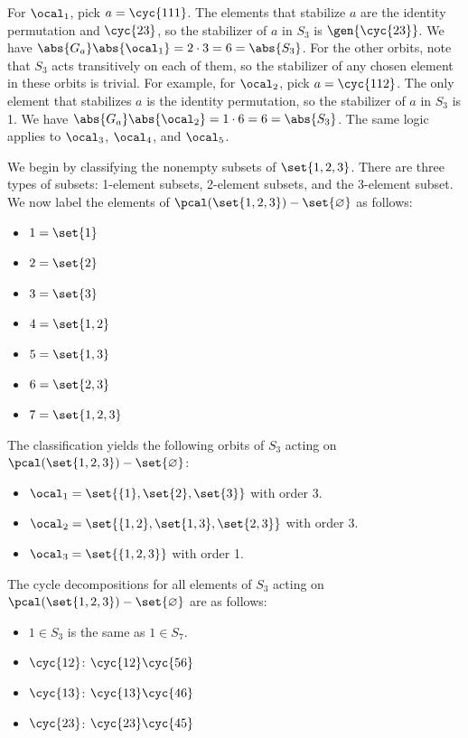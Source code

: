 \begin{solenum}
\begin{itemize}
	\end{itemize}
	For $\ocal_1$, pick $a = \cyc{1 1 1}$.
	The elements that stabilize $a$ are the identity permutation and $\cyc{2 3}$, so the stabilizer of $a$ in $S_3$ is $\gen{\cyc{2 3}}$.
	We have $\abs{G_a}\abs{\ocal_1} = 2 \cdot 3 = 6 = \abs{S_3}$.
	For the other orbits, note that $S_3$ acts transitively on each of them, so the stabilizer of any chosen element in these orbits is trivial.
	For example, for $\ocal_2$, pick $a = \cyc{1 1 2}$.
	The only element that stabilizes $a$ is the identity permutation, so the stabilizer of $a$ in $S_3$ is 1.
	We have $\abs{G_a}\abs{\ocal_2} = 1 \cdot 6 = 6 = \abs{S_3}$.
	The same logic applies to $\ocal_3$, $\ocal_4$, and $\ocal_5$.
	\item We begin by classifying the nonempty subsets of $\set{1, 2, 3}$.
	There are three types of subsets: 1-element subsets, 2-element subsets, and the 3-element subset.
	We now label the elements of $\pcal(\set{1, 2, 3}) - \set{\varnothing}$ as follows:
    \begin{itemize}
        \item $1 = \set{1}$
        \item $2 = \set{2}$
        \item $3 = \set{3}$
        \item $4 = \set{1, 2}$
        \item $5 = \set{1, 3}$
        \item $6 = \set{2, 3}$
        \item $7 = \set{1, 2, 3}$
    \end{itemize}
	The classification yields the following orbits of $S_3$ acting on $\pcal(\set{1, 2, 3}) - \set{\varnothing}$:
	\begin{itemize}
		\item $\ocal_1 = \set{\{1}, \set{2}, \set{3}\}$ with order 3.
		\item $\ocal_2 = \set{\{1, 2}, \set{1, 3}, \set{2, 3}\}$ with order 3.
		\item $\ocal_3 = \set{\{1, 2, 3}\}$ with order 1.
	\end{itemize}
	The cycle decompositions for all elements of $S_3$ acting on $\pcal(\set{1, 2, 3}) - \set{\varnothing}$ are as follows:
	\begin{itemize}
		\item $1 \in S_3$ is the same as $1 \in S_7$.
		\item $\cyc{1 2}$: $\cyc{1 2}\cyc{5 6}$
		\item $\cyc{1 3}$: $\cyc{1 3}\cyc{4 6}$
		\item $\cyc{2 3}$: $\cyc{2 3}\cyc{4 5}$

\end{itemize}
\end{solenum}
